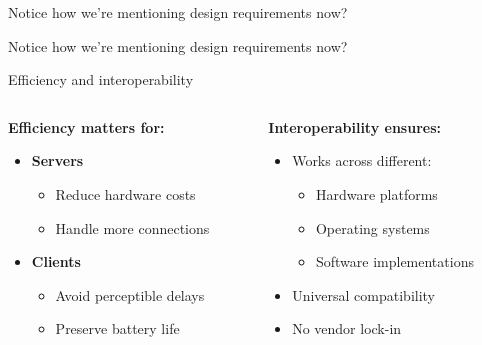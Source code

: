 \documentclass[aspectratio=169, lualatex, handout]{beamer}
\begin{document}
\begin{frame}{Notice how we're mentioning design requirements now?}
\end{frame}

\begin{frame}{Notice how we're mentioning design requirements now?}
	\begin{center}
	\end{center}
\end{frame}

\begin{frame}{Efficiency and interoperability}
	\begin{columns}[c]
		\begin{column}{0.5\textwidth}
			\textbf{Efficiency matters for:}
			\begin{itemize}[<+->]
				\item \textbf{Servers}
				      \begin{itemize}
					      \item Reduce hardware costs
					      \item Handle more connections
				      \end{itemize}
				\item \textbf{Clients}
				      \begin{itemize}
					      \item Avoid perceptible delays
					      \item Preserve battery life
				      \end{itemize}
			\end{itemize}
		\end{column}
		\begin{column}{0.5\textwidth}
			\textbf{Interoperability ensures:}
			\begin{itemize}[<+->]
				\item Works across different:
				      \begin{itemize}
					      \item Hardware platforms
					      \item Operating systems
					      \item Software implementations
				      \end{itemize}
				\item Universal compatibility
				\item No vendor lock-in
			\end{itemize}
		\end{column}
	\end{columns}
\end{frame}
\end{document}
